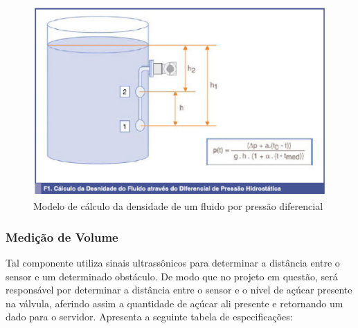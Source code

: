 \begin{figure}[h]
	\centering
	\includegraphics[keepaspectratio=true,scale=0.4]{figuras/densidade.eps}
	\caption{Modelo de cálculo da densidade de um fluido por pressão diferencial}
	\label{densidade}
\end{figure}

\subsubsection{Medição de Volume}

Tal componente utiliza sinais ultrassônicos para determinar a distância entre o sensor e um determinado obstáculo. De modo que no projeto em questão, será responsável por determinar a distância entre o sensor e o nível de açúcar presente na válvula, aferindo assim a quantidade de açúcar ali presente e retornando um dado para o servidor. Apresenta a seguinte tabela de especificações:

